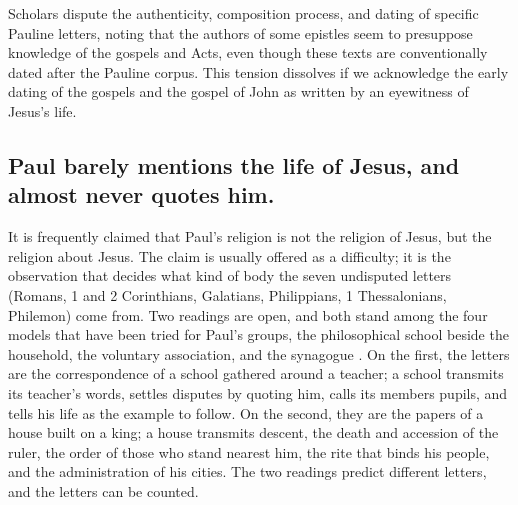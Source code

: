 Scholars dispute the authenticity, composition process, and dating of specific Pauline letters, noting that the authors of some epistles seem to presuppose knowledge of the gospels and Acts, even though these texts are conventionally dated after the Pauline corpus.
This tension dissolves if we acknowledge the early dating of the gospels and the gospel of John as written by an eyewitness of Jesus's life.

\subsection{Paul barely mentions the life of Jesus, and almost never quotes him.}\label{subsec:paul-barely-mentions-the-life-of-jesus-and-almost-never-quotes-him.}

It is frequently claimed that Paul's religion is not the religion of Jesus, but the religion about Jesus.
The claim is usually offered as a difficulty; it is the observation that decides what kind of body the seven undisputed letters (Romans, 1 and 2 Corinthians, Galatians, Philippians, 1 Thessalonians, Philemon) come from.
Two readings are open, and both stand among the four models that have been tried for Paul's groups, the philosophical school beside the household, the voluntary association, and the synagogue \cite{meeks:urban}.
On the first, the letters are the correspondence of a school gathered around a teacher; a school transmits its teacher's words, settles disputes by quoting him, calls its members pupils, and tells his life as the example to follow.
On the second, they are the papers of a house built on a king; a house transmits descent, the death and accession of the ruler, the order of those who stand nearest him, the rite that binds his people, and the administration of his cities.
The two readings predict different letters, and the letters can be counted.

